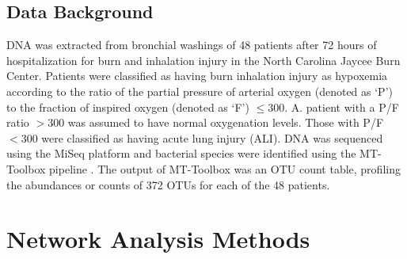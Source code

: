  \subsection{Data Background}
\indent DNA was extracted from bronchial washings of 48 patients after 72 hours of hospitalization for burn and inhalation injury in the North Carolina Jaycee Burn Center. Patients were classified as having burn inhalation injury as hypoxemia according to the ratio of the partial pressure of arterial oxygen (denoted as `P') to the fraction of inspired oxygen (denoted as `F') $\le 300$. A. patient with a P/F ratio $>300$ was assumed to have normal oxygenation levels. Those with P/F $<300$ were classified as having acute lung injury (ALI). DNA was sequenced using the MiSeq \cite{miSeq} platform and bacterial species were identified using the MT-Toolbox pipeline \cite{your}. The output of MT-Toolbox was an OTU count table, profiling the abundances or counts of 372 OTUs for each of the 48 patients.

\section{Network Analysis Methods}
